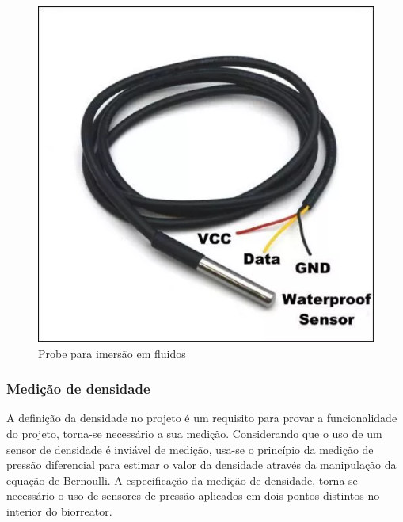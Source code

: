 \begin{figure}[h]
	\centering
	\includegraphics[keepaspectratio=true,scale=0.3]{figuras/probe.eps}
	\caption{Probe para imersão em fluidos}
	\label{probe}
\end{figure}

\subsubsection{Medição de densidade}

A definição da densidade no projeto \nocite{ADS1115} é um requisito para provar a funcionalidade do projeto, torna-se necessário a sua medição. Considerando que o uso de um sensor de densidade é inviável de medição, usa-se o princípio da medição de pressão diferencial para estimar o valor da densidade através da manipulação da equação de Bernoulli. A especificação da medição de densidade, torna-se necessário o uso de sensores de pressão aplicados em dois pontos distintos no interior do biorreator.

